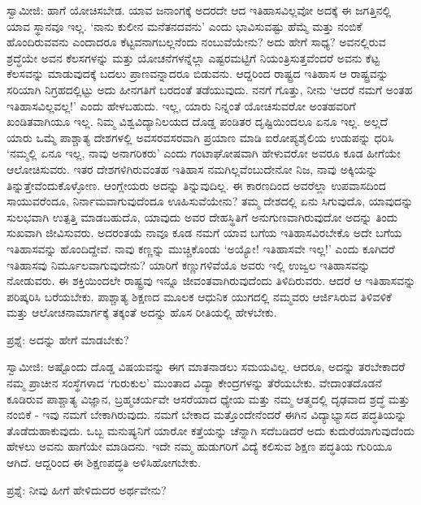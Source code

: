 ಸ್ವಾಮೀಜಿ: ಹಾಗೆ ಯೋಚಿಸಬೇಡ. ಯಾವ ಜನಾಂಗಕ್ಕೆ ಅದರದೇ ಆದ ಇತಿಹಾಸವಿಲ್ಲವೋ ಅದಕ್ಕೆ ಈ ಜಗತ್ತಿನಲ್ಲಿ ಯಾವ ಸ್ಥಾನವೂ ಇಲ್ಲ. ‘ನಾನು ಕುಲೀನ ಮನೆತನದವನು’ ಎಂದು ಭಾವಿಸುವಷ್ಟು ಹೆಮ್ಮೆ ಮತ್ತು ನಂಬಿಕೆ ಹೊಂದಿರುವವನು ಎಂದಾದರೂ ಕೆಟ್ಟವನಾಗಬಲ್ಲನೆಂದು ನಂಬುವೆಯೇನು? ಅದು ಹೇಗೆ ಸಾಧ್ಯ? ಅವನಲ್ಲಿರುವ ಶ್ರದ್ಧೆಯೇ ಅವನ ಕೆಲಸಗಳನ್ನು ಮತ್ತು ಯೋಚನೆಗಳನ್ನೆಲ್ಲಾ ಎಷ್ಟರಮಟ್ಟಿಗೆ ನಿಯಂತ್ರಿಸುತ್ತವೆಂದರೆ ಅವನು ಕೆಟ್ಟ ಕೆಲಸವನ್ನು ಮಾಡುವುದಕ್ಕೆ ಬದಲು ಪ್ರಾಣವನ್ನಾದರೂ ಬಿಡುವನು. ಆದ್ದರಿಂದ ರಾಷ್ಟ್ರದ ಇತಿಹಾಸ ಆ ರಾಷ್ಟ್ರವನ್ನು ಸರಿಯಾಗಿ ನಿಗ್ರಹದಲ್ಲಿಟ್ಟು ಅದು ಹೀನಗತಿಗೆ ಬರದಂತೆ ತಡೆಯುವುದು. ನನಗೆ ಗೊತ್ತು, ನೀನು ‘ಆದರೆ ನಮಗೆ ಅಂತಹ ಇತಿಹಾಸವಿಲ್ಲವಲ್ಲ!’ ಎಂದು ಹೇಳಬಹುದು. ಇಲ್ಲ, ಯಾರು ನಿನ್ನಂತೆ ಯೋಚಿಸುವರೋ ಅಂತಹವರಿಗೆ ಖಂಡಿತವಾಗಿಯೂ ಇಲ್ಲ. ನಿಮ್ಮ ವಿಶ್ವವಿದ್ಯಾನಿಲಯದ ದೊಡ್ಡ ಪಂಡಿತರ ದೃಷ್ಟಿಯಿಂದಲೂ ಏನೂ ಇಲ್ಲ. ಅಲ್ಲದೆ ಯಾರು ಒಮ್ಮೆ ಪಾಶ್ಚಾತ್ಯ ದೇಶಗಳಲ್ಲಿ ಅವಸರವಸರವಾಗಿ ಪ್ರಯಾಣ ಮಾಡಿ ಐರೋಪ್ಯಶೈಲಿಯ ಉಡುಪನ್ನು ಧರಿಸಿ ‘ನಮ್ಮಲ್ಲಿ ಏನೂ ಇಲ್ಲ, ನಾವು ಅನಾಗರಿಕರು’ ಎಂದು ಗಂಟಾಘೋಷವಾಗಿ ಹೇಳುವರೋ ಅವರೂ ಕೂಡ ಹೀಗೆಯೇ ಆಲೋಚಿಸುವರು. ಇತರ ದೇಶಗಳಿಗಿರುವಂತಹ ಇತಿಹಾಸ ನಮಗಿಲ್ಲವೆಂಬುದೇನೋ ನಿಜ, ನಾವು ಅಕ್ಕಿಯನ್ನು ತಿನ್ನುತ್ತೇವೆಂದುಕೊಳ್ಳೋಣ. ಆಂಗ್ಲೇಯರು ಅದನ್ನು ತಿನ್ನುವುದಿಲ್ಲ. ಈ ಕಾರಣದಿಂದ ಅವರೆಲ್ಲಾ ಉಪವಾಸದಿಂದ ಸಾಯುವರೆಂದೂ, ನಿರ್ನಾಮವಾಗುವುದೆಂದೂ ಊಹಿಸುವೆಯೇನು? ತಮ್ಮ ದೇಶದಲ್ಲಿ ಏನು ಸಿಗುವುದೊ, ಯಾವುದನ್ನು ಸುಲಭವಾಗಿ ಉತ್ಪತ್ತಿ ಮಾಡಬಹುದೊ, ಯಾವುದು ಅವರ ದೇಹಸ್ಥಿತಿಗೆ ಅನುಗುಣವಾಗಿರುವುದೋ ಅದನ್ನು ತಿಂದು ಸುಖವಾಗಿ ಜೀವಿಸುವರು. ಅದರಂತಯೆ ನಾವೂ ಕೂಡ ನಮಗೆ ಯಾವ ಬಗೆಯ ಇತಿಹಾಸವಿರಬೇಕೊ ಅದೇ ಬಗೆಯ ಇತಿಹಾಸವನ್ನು ಹೊಂದಿದ್ದೇವೆ. ನಾವು ಕಣ್ಣನ್ನು ಮುಚ್ಚಿಕೊಂಡು ‘ಅಯ್ಯೋ! ಇತಿಹಾಸವೇ ಇಲ್ಲ!’ ಎಂದು ಕೂಗಿದರೆ ಇತಿಹಾಸವು ನಿರ್ಮೂಲವಾಗುವುದೇನು? ಯಾರಿಗೆ ಕಣ್ಣುಗಳಿವೆಯೊ ಅವರು ಇಲ್ಲಿ ಉಜ್ವಲ ಇತಿಹಾಸವನ್ನು ನೋಡುವರು. ಈ ಶಕ್ತಿಯಿಂದಲೇ ರಾಷ್ಟ್ರವು ಇನ್ನೂ ಜೀವಂತವಾಗಿರುವುದೆಂದು ತಿಳಿದಿರುವರು. ಆದರೆ ಆ ಇತಿಹಾಸವನ್ನು ಪರಿಷ್ಕರಿಸಿ ಬರೆಯಬೇಕು. ಪಾಶ್ಚಾತ್ಯ ಶಿಕ್ಷಣದ ಮೂಲಕ ಆಧುನಿಕ ಯುಗದಲ್ಲಿ ನಮ್ಮವರು ಆರ್ಜಿಸಿರುವ ತಿಳಿವಳಿಕೆ ಮತ್ತು ಆಲೋಚನಾಮಾರ್ಗಕ್ಕೆ ತಕ್ಕಂತೆ ಅದನ್ನು ಹೊಸ ರೀತಿಯಲ್ಲಿ ಹೇಳಬೇಕು.

ಪ್ರಶ್ನೆ: ಅದನ್ನು ಹೇಗೆ ಮಾಡಬೇಕು?

ಸ್ವಾಮೀಜಿ: ಅಷ್ಟೊಂದು ದೊಡ್ಡ ವಿಷಯವನ್ನು ಈಗ ಮಾತನಾಡಲು ಸಮಯವಿಲ್ಲ. ಆದರೂ, ಅದನ್ನು ತರಬೇಕಾದರೆ ನಮ್ಮ ಪ್ರಾಚೀನ ಸಂಸ್ಥೆಗಳಾದ ‘ಗುರುಕುಲ’ ಮುಂತಾದ ವಿದ್ಯಾ ಕೇಂದ್ರಗಳನ್ನು ತೆರೆಯಬೇಕು. ವೇದಾಂತದೊಡನೆ ಕೂಡಿರುವ ಪಾಶ್ಚಾತ್ಯ ವಿಜ್ಞಾನ, ಬ್ರಹ್ಮಚರ್ಯವೇ ಆಸರೆಯಾದ ಧ್ಯೇಯ ಮತ್ತು ನಮ್ಮ ಆತ್ಮದಲ್ಲಿ ದೃಢವಾದ ಶ್ರದ್ಧೆ ಮತ್ತು ನಂಬಿಕೆ - ಇವು ನಮಗೆ ಬೇಕಾಗಿರುವುದು. ನಮಗೆ ಬೇಕಾದ ಮತ್ತೊಂದೇನೆಂದರೆ ಈಗಿನ ವಿದ್ಯಾಭ್ಯಾಸದ ಪದ್ಧತಿಯನ್ನು ತೊಡೆದುಹಾಕುವುದು. ಒಬ್ಬ ಮನುಷ್ಯನಿಗೆ ಯಾರೋ ಕತ್ತೆಯನ್ನು ಚೆನ್ನಾಗಿ ಸದೆಬಡಿದರೆ ಅದು ಕುದುರೆಯಾಗುವುದೆಂದು ಹೇಳಲು ಅವನು ಹಾಗೆಯೇ ಮಾಡಿದನು. ಇದೇ ನಮ್ಮ ಹುಡುಗರಿಗೆ ವಿದ್ಯೆ ಕಲಿಸುವ ಶಿಕ್ಷಣ ಪದ್ಧತಿಯ ಗುರಿಯೂ ಆಗಿದೆ. ಆದ್ದರಿಂದ ಈ ಶಿಕ್ಷಣಪದ್ಧತಿ ಅಳಿಸಿಹೋಗಬೇಕು.

ಪ್ರಶ್ನೆ: ನೀವು ಹೀಗೆ ಹೇಳಿದುದರ ಅರ್ಥವೇನು?


